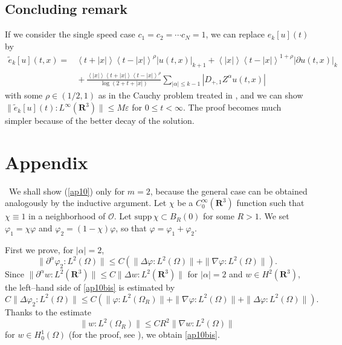 \documentclass[12pt]{amsart}
\newcommand{\R}{{\mathbf R}}
\newcommand{\ve}{\varepsilon}
\newcommand{\pa}{\partial}
\newcommand{\jb}[1]{\left\langle #1 \right\rangle}
\newcommand{\norm}[2]{\|#1 \!:\! #2\|}
\renewcommand{\thelemma}{\thesection.\arabic{lemma}}
\numberwithin{equation}{section}
\begin{document}
\subsection{Concluding remark}
If we consider the single speed case
$c_1=c_2=\cdots c_N=1$, we can replace $e_{k}[u](t)$ by
\begin{align*}
\widetilde{e}_k[u](t,x)=&\jb{t+|x|}\jb{t-|x|}^\rho|u(t,x)|_{k+1}
{}+\jb{|x|}\jb{t-|x|}^{1+\rho}|\pa u(t,x)|_{k}\\
& {}+\frac{\jb{|x|}\jb{t+|x|}\jb{t-|x|}^\rho}{\log(2+t+|x|)}
\sum_{|\alpha|\le k-1} |D_{+, 1}Z^\alpha u(t,x)|
\end{align*}
with some $\rho \in (1/2, 1)$ as in the Cauchy problem treated in \cite{KaKu07},
and we can show $\norm{\widetilde{e}_k[u](t)}{L^\infty(\R^3)}\le M\ve$
for $0\le t<\infty$. The proof becomes much simpler because of the better
decay of the solution.
\renewcommand{\theequation}{A.\arabic{equation}}

\setcounter{equation}{0}  %
\renewcommand{\thelemma}{A.\arabic{lemma}}

\renewcommand{\thetheorem}{A.\arabic{theorem}}

\setcounter{theorem}{0}
\section*{Appendix}


\ 
We shall show (\ref{ap10}) only for $m=2$, because the general case can be obtained analogously by the inductive argument.
Let $\chi$ be a $C^\infty_0(\R^3)$ function such that
$\chi \equiv 1$ in a neighborhood of ${\mathcal O}$.
Let $\text{supp}\,\chi \subset B_R(0)$ for some $R>1$.
We set $\varphi_1=\chi \varphi$ and $\varphi_2=(1-\chi) \varphi$, so that $\varphi=\varphi_1+\varphi_2$.

First we prove, for $|\alpha|=2$,
\begin{equation}\label{ap10bis}
 \| \pa^\alpha \varphi_2\!:\!{L^2(\Omega)}\| \le
C(\|\Delta \varphi\!:\!{L^2(\Omega)}\| 
  +\|\nabla \varphi\!:\!{L^2(\Omega)}\|).
\end{equation}
Since $\| \pa^\alpha w\!:\!{L^2(\R^3)}\| \le
C\|\Delta w\!:\!{L^2(\R^3)}\|$ for $|\alpha|=2$ and 
$w \in H^2(\R^3)$, the left--hand side of \eqref{ap10bis} is estimated by
\begin{equation}\nonumber
 C\|\Delta \varphi_2\!:\!{L^2(\Omega)}\|
\le C(\|\varphi\!:\!{L^2(\Omega_R)}\|
  +\|\nabla \varphi\!:\!{L^2(\Omega)}\|
  +\|\Delta \varphi\!:\!{L^2(\Omega)}\|).
\end{equation}
Thanks to the estimate
\begin{equation}\label{ha}
  \|w\!:\!{L^2(\Omega_R)}\| \le C R^2
  \|\nabla w\!:\!{L^2(\Omega)}\|
\end{equation}
for $w \in H_0^1(\Omega)$
(for the proof, see \cite{LaPh}), we obtain \eqref{ap10bis}.
\end{document}
